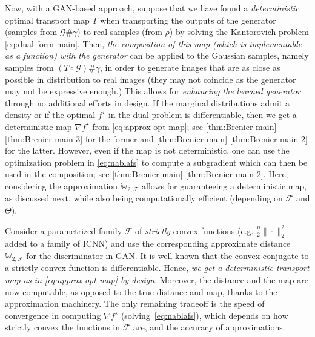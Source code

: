 \documentclass[10pt]{article}
\newcommand{\norm}[1]{\|#1\|}
\newcommand{\W}{\mathds{W}}
\newcommand{\calF}{\mathcal{F}}
\numberwithin{equation}{section}
\begin{document}
Now, with a GAN-based approach, suppose that we have found a {\em deterministic} optimal transport map $T$ when transporting the outputs of the generator (samples from $\mathcal{G}\#\gamma$) to real samples (from $\rho$) by solving the Kantorovich problem \eqref{eq:dual-form-main}. Then, {\em the composition of this map (which is implementable as a function) with the generator} can be applied to the Gaussian samples, namely samples from $(T \circ \mathcal{G})\#\gamma$, in order to generate images that are as close as possible in distribution to real images (they may not coincide as the generator may not be expressive enough.) This allows for {\em enhancing the learned generator} through no additional efforts in design. If the marginal distributions admit a density or if the optimal $f^\star$ in the dual problem is differentiable, then we get a deterministic map $\nabla f^\star$ from \eqref{eq:approx-opt-map}; see \autoref{thm:Brenier-main}-\eqref{thm:Brenier-main-3} for the former and \autoref{thm:Brenier-main}-\eqref{thm:Brenier-main-2} for the latter. However, even if the map is not deterministic, one can use the optimization problem in \eqref{eq:nablafs} to compute a subgradient which can then be used in the composition; see \autoref{thm:Brenier-main}-\eqref{thm:Brenier-main-2}.  
Here, considering the approximation $\W_{2,\calF}$ allows for guaranteeing a deterministic map, as discussed next, while also being computationally efficient (depending on $\calF$ and $\Theta$). 

Consider a parametrized family $\calF$ of {\em strictly} convex functions (e.g.  $\frac{\eta}{2}\norm{\cdot}_2^2$ added to a family of ICNN) and use the corresponding approximate distance $\W_{2,\calF}$ for the discriminator in GAN. It is well-known that the convex conjugate to a strictly convex function is differentiable. Hence, {\em we get a deterministic transport map as in \eqref{eq:approx-opt-map} by design}. 
Moreover, the distance and the map are now computable, as opposed to the true distance and map, thanks to the approximation machinery. %
The only remaining tradeoff is the speed of convergence in computing $\nabla f^\star$ (solving~\eqref{eq:nablafs}), which depends on how strictly convex the functions in $\calF$ are, and the accuracy of approximations. 
\end{document}
